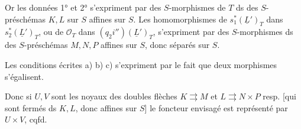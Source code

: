 Or les données 1° et 2° s'expriment par des $S$-morphismes de $T$ ds des $S$-préschémas  $K,L$ sur $S$ affines sur $S$. Les homomorphismes de $s_1^*(\underline L')_T$ dans $s_2^*(\underline L')_T$, ou de  $\mathcal O_T$ dans $(q_2i'')(\underline L')_T$,   s'expriment par des $S$-morphismes ds des $S$-préschémas $M,N,P$  affines sur $S$, donc séparés sur $S$.


Les conditions écrites a) b) c) s'expriment par le fait que deux  morphismes
s'égalisent.

Donc si  $U,V$ sont les noyaux des doubles flèches $K\rightrightarrows M$ et $L\rightrightarrows N\times P$ resp. [qui sont fermés ds $K,L$, donc affines sur $S$] le foncteur envisagé est représenté par $U\times V$, cqfd.
